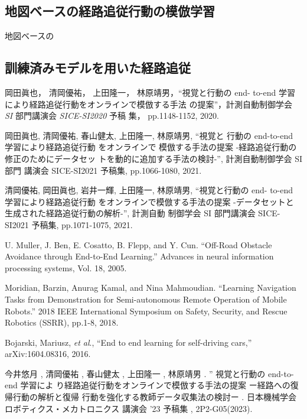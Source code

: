 \documentclass{jarticle}
\begin{document}
\subsection{地図ベースの経路追従行動の模倣学習}
地図ベースの\\

\subsection{訓練済みモデルを用いた経路追従}



\footnotesize
\begin{thebibliography}{99}

岡田眞也， 清岡優祐， 上田隆一， 林原靖男，“視覚と行動の end-
to-end 学習により経路追従行動をオンラインで模倣する手法
の提案”，計測自動制御学会 \textit{SI} 部門講演会 \textit{SICE-SI2020} 予稿
集， pp.1148-1152, 2020.

岡田眞也, 清岡優祐, 春山健太, 上田隆一, 林原靖男, “視覚と
行動の end-to-end 学習により経路追従行動 をオンラインで
模倣する手法の提案 -経路追従行動の修正のためにデータセッ
トを動的に追加する手法の検討-”, 計測自動制御学会 SI 部門
講演会 SICE-SI2021 予稿集, pp.1066-1080, 2021.

清岡優祐, 岡田眞也, 岩井一輝, 上田隆一, 林原靖男, “視覚と行動の end-
to-end 学習により経路追従行動 をオンラインで模倣する手法の提案 -データセットと
生成された経路追従行動の解析-”, 計測自動 制御学会 SI 部門講演会 SICE-SI2021 
予稿集, pp.1071-1075, 2021.

U. Muller, J. Ben, E. Cosatto, B. Flepp, and Y. Cun.
“Off-Road Obstacle Avoidance through End-to-End Learning.”
Advances in neural information processing systems,
Vol. 18, 2005.

Moridian, Barzin, Anurag Kamal, and Nina Mahmoudian. 
“Learning Navigation Tasks from Demonstration for Semi-autonomous Remote
Operation of Mobile Robots.” 2018 IEEE International Symposium on
Safety, Security, and Rescue Robotics (SSRR), pp.1-8, 2018.

Bojarski, Mariusz, \textit{et al}.,
“End to end learning for self-driving cars,” arXiv:1604.08316, 2016.

今井悠月 , 清岡優祐 , 春山健太 , 上田隆一 , 林原靖男 . ” 視覚と行動の end-to-end 学習によ
り経路追従行動をオンラインで模倣する手法の提案
ー経路への復帰行動の解析と復帰
行動を強化する教師データ収集法の検討ー . 日本機械学会ロボティクス・メカトロニクス
講演会 ’23 予稿集 , 2P2-G05(2023).

\end{thebibliography}

\normalsize
\end{document}

